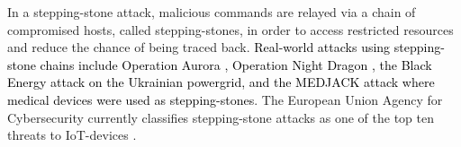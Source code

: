 In a stepping-stone attack, malicious commands are relayed via a chain of compromised hosts, called stepping-stones, in order to access restricted resources and reduce the chance of being traced back. \textcolor{black}{Real-world attacks using stepping-stone chains include Operation Aurora \cite{tankard2011advanced}, Operation Night Dragon \cite{mcafee2015report}, the Black Energy \cite{eisac2017report} attack on the Ukrainian powergrid, and the MEDJACK \cite{ayala2016active} attack where medical devices were used as stepping-stones}. The European Union Agency for Cybersecurity currently classifies stepping-stone attacks as one of the top ten threats to IoT-devices \cite{enisa2017baseline}.





